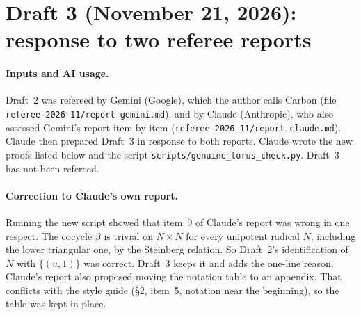 \documentclass[12pt,letterpaper]{article}
\begin{document}
\section*{Draft 3 (November 21, 2026): response to two referee reports}
\paragraph{Inputs and AI usage.}
Draft~2 was refereed by Gemini (Google), which the author calls Carbon (file
\texttt{referee-2026-11/report-gemini.md}), and by Claude (Anthropic), who also
assessed Gemini's report item by item (\texttt{referee-2026-11/report-claude.md}).
Claude then prepared Draft~3 in response to both reports.  Claude wrote the new
proofs listed below and the script \texttt{scripts/genuine\_torus\_check.py}.
Draft~3 has not been refereed.

\paragraph{Correction to Claude's own report.}
Running the new script showed that item~9 of Claude's report was wrong in one
respect.  The cocycle $\beta$ is trivial on $N\times N$ for every unipotent radical
$N$, including the lower triangular one, by the Steinberg relation.  So Draft~2's
identification of $N$ with $\{(u,1)\}$ was correct.  Draft~3 keeps it and adds the
one-line reason.  Claude's report also proposed moving the notation table to an
appendix.  That conflicts with the style guide (\S2, item~5, notation near the
beginning), so the table was kept in place.
\end{document}
